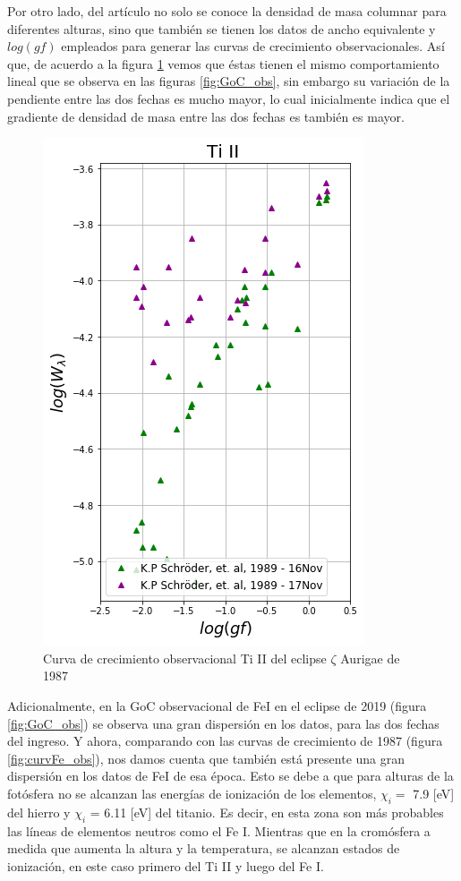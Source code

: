 \documentclass[12pt,oneside,openany,letter]{book}
\begin{document}
Por otro lado, del artículo \cite{kps1O} no solo se conoce la densidad de masa columnar para diferentes alturas, sino que también se tienen los datos de ancho equivalente y $log(gf)$ empleados para generar las curvas de crecimiento observacionales. Así que, de acuerdo a la figura \ref{fig:Ti2Klaus} vemos que éstas tienen el mismo comportamiento lineal que se observa en las figuras \ref{fig:GoC_obs}, sin embargo su variación de la pendiente entre las dos fechas es mucho mayor, lo cual inicialmente indica que el gradiente de densidad de masa entre las dos fechas es también es mayor.

\begin{figure}[h]
    \centering
    \includegraphics[width=0.5\linewidth]{Gaficas/Ti2Klaus.png}
    \caption{Curva de crecimiento observacional Ti II del eclipse $\zeta$ Aurigae de 1987}
    \label{fig:Ti2Klaus}
\end{figure}

Adicionalmente, en la GoC observacional de FeI en el eclipse de 2019 (figura \ref{fig:GoC_obs}) se observa una gran dispersión en los datos, para las dos fechas del ingreso. Y ahora, comparando con las curvas de crecimiento de 1987 (figura \ref{fig:curvFe_obs}), nos damos cuenta que también está presente una gran dispersión en los datos de FeI de esa época. Esto se debe a que para alturas de la fotósfera no se alcanzan las energías de ionización de los elementos, $\chi_i =$ 7.9 [eV] del hierro y $\chi_i$ = 6.11 [eV] del titanio. Es decir, en esta zona son más probables las líneas de elementos neutros como el Fe I. Mientras que en la cromósfera a medida que aumenta la altura y la temperatura, se alcanzan estados de ionización, en este caso primero del Ti II y luego del Fe I.
\end{document}
